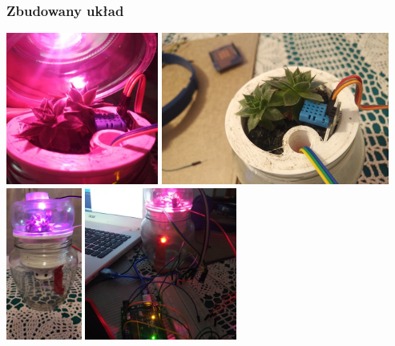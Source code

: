 \documentclass[a4paper,11pt]{uzreport}
\begin{document}
\subsubsection{Zbudowany układ}
\begin{multicols}{3}
\centering
	     \includegraphics[width=.9\columnwidth,height=5cm,keepaspectratio]{listings/swiecisie.jpg}
		 \includegraphics[width=.9\columnwidth,height=5cm,keepaspectratio]{listings/brakswiatla.jpg}
	     \includegraphics[width=.9\columnwidth,height=5cm,keepaspectratio]{listings/calosc.jpg}
		 \includegraphics[width=.9\columnwidth,height=5cm,keepaspectratio]{listings/calosctest.jpg}

\end{multicols}
\end{document}
